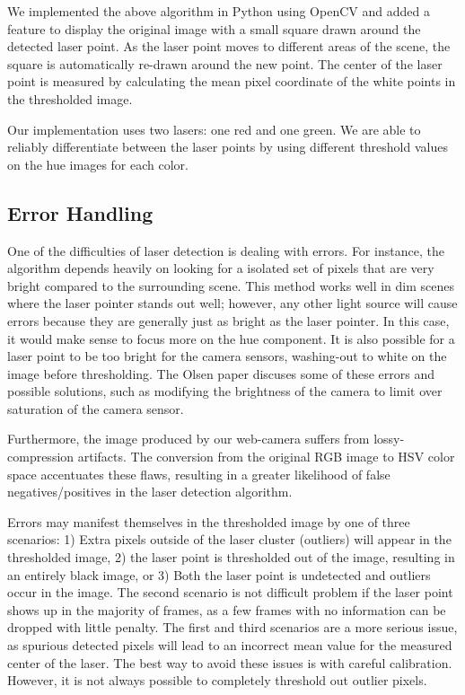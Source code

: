 \documentclass[10pt,twocolumn,letterpaper]{article}
\begin{document}
We implemented the above algorithm in Python using OpenCV and added a feature to display the original image with a small square drawn around the detected laser point.  As the laser point moves to different areas of the scene, the square is automatically re-drawn around the new point.  The center of the laser point is measured by calculating the mean pixel coordinate of the white points in the thresholded image.

Our implementation uses two lasers: one red and one green.  We are able to reliably differentiate between the laser points by using different threshold values on the hue images for each color.

\subsection{Error Handling}

One of the difficulties of laser detection is dealing with errors. For instance, the algorithm depends heavily on looking for a isolated set of pixels that are very bright compared to the surrounding scene. This method works well in dim scenes where the laser pointer stands out well; however, any other light source will cause errors because they are generally just as bright as the laser pointer. In this case, it would make sense to focus more on the hue component. It is also possible for a laser point to be too bright for the camera sensors, washing-out to white on the image before thresholding. The Olsen paper \cite{olsen01laser} discuses some of these errors and possible solutions, such as modifying the brightness of the camera to limit over saturation of the camera sensor.

Furthermore, the image produced by our web-camera suffers from lossy-compression artifacts.  The conversion from the original RGB image to HSV color space accentuates these flaws, resulting in a greater likelihood of false negatives/positives in the laser detection algorithm.

Errors may manifest themselves in the thresholded image by one of three scenarios: 1) Extra pixels outside of the laser cluster (outliers) will appear in the thresholded image, 2) the laser point is thresholded out of the image, resulting in an entirely black image, or 3) Both the laser point is undetected and outliers occur in the image.  The second scenario is not difficult problem if the laser point shows up in the majority of frames, as a few frames with no information can be dropped with little penalty.  The first and third scenarios are a more serious issue, as spurious detected pixels will lead to an incorrect mean value for the measured center of the laser.  The best way to avoid these issues is with careful calibration.  However, it is not always possible to completely threshold out outlier pixels.
\end{document}
